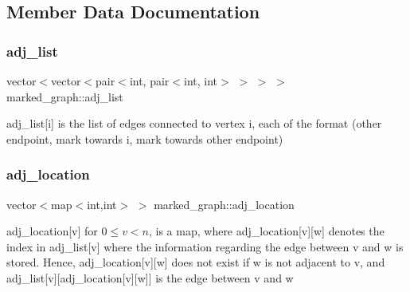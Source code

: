 \subsection{Member Data Documentation}
\mbox{\label{classmarked__graph_a1a0bf7ca413a278763f7c878b3b6fd6f}} 
\subsubsection{\texorpdfstring{adj\+\_\+list}{adj\_list}}
{\footnotesize\ttfamily vector$<$vector$<$pair$<$int, pair$<$int, int$>$ $>$ $>$ $>$ marked\+\_\+graph\+::adj\+\_\+list}



adj\+\_\+list\mbox{[}i\mbox{]} is the list of edges connected to vertex i, each of the format (other endpoint, mark towards i, mark towards other endpoint) 

\mbox{\label{classmarked__graph_a3ae722ea9583ad23af34d789a88ac01a}} 
\subsubsection{\texorpdfstring{adj\+\_\+location}{adj\_location}}
{\footnotesize\ttfamily vector$<$map$<$int,int$>$ $>$ marked\+\_\+graph\+::adj\+\_\+location}



adj\+\_\+location\mbox{[}v\mbox{]} for $0 \leq v < n$, is a map, where adj\+\_\+location\mbox{[}v\mbox{]}\mbox{[}w\mbox{]} denotes the index in adj\+\_\+list\mbox{[}v\mbox{]} where the information regarding the edge between v and w is stored. Hence, adj\+\_\+location\mbox{[}v\mbox{]}\mbox{[}w\mbox{]} does not exist if w is not adjacent to v, and adj\+\_\+list\mbox{[}v\mbox{]}\mbox{[}adj\+\_\+location\mbox{[}v\mbox{]}\mbox{[}w\mbox{]}\mbox{]} is the edge between v and w 

\mbox{\label{classmarked__graph_aee10b537408de42476609c1e45c075d0}} 
